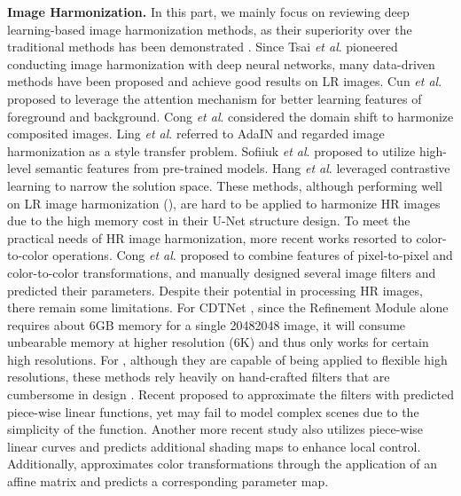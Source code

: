 \documentclass[10pt,journal,twocolumn,twoside]{IEEEtran}
\newcommand{\etal}{\textit{et al}. }
\begin{document}
\textbf{Image Harmonization.} In this part, we mainly focus on reviewing deep learning-based image harmonization methods, as their superiority over the traditional methods\cite{lalonde2007using, xue2012understanding, reinhard2001color, pitie2005n, sunkavalli2010multi} has been demonstrated \cite{tsai2017deep}.  Since Tsai \etal \cite{tsai2017deep} pioneered conducting image harmonization with deep neural networks,  many data-driven methods\cite{cun2020improving, cong2020dovenet, guo2021image, ling2021region, sofiiuk2021foreground, hang2022scs} have been proposed and achieve good results on LR images. Cun \etal \cite{cun2020improving} proposed to leverage the attention mechanism for better learning features of foreground and background. Cong \etal \cite{cong2020dovenet} considered the domain shift to harmonize composited images. Ling \etal \cite{ling2021region} referred to AdaIN\cite{huang2017arbitrary} and regarded image harmonization as a style transfer problem. Sofiiuk \etal \cite{sofiiuk2021foreground} proposed to utilize high-level semantic features from pre-trained models. Hang \etal \cite{hang2022scs} leveraged contrastive learning to narrow the solution space.  These methods, although performing well on LR image harmonization (), are hard to be applied to harmonize HR images due to the high memory cost in their U-Net\cite{ronneberger2015u} structure design.  To meet the practical needs of HR image harmonization, more recent works \cite{cong2022high, ke2022harmonizer, xue2022dccf, liang2022spatial, wang2023semi, guerreiro2023pct} resorted to color-to-color operations. Cong \etal \cite{cong2022high} proposed to combine features of pixel-to-pixel and color-to-color transformations, and \cite{ke2022harmonizer, xue2022dccf} manually designed several image filters and predicted their parameters. Despite their potential in processing HR images, there remain some limitations. For CDTNet \cite{cong2022high}, since the Refinement Module alone requires about 6GB memory for a single 20482048 image, it will consume unbearable memory at higher resolution (\eg 6K) and thus only works for certain high resolutions. For \cite{ke2022harmonizer, xue2022dccf}, although they are capable of being applied to flexible high resolutions, these methods rely heavily on hand-crafted filters that are cumbersome in design \cite{ke2022harmonizer, xue2022dccf}. Recent \cite{liang2022spatial} proposed to approximate the filters with predicted piece-wise linear functions, yet may fail to model complex scenes due to the simplicity of the function. Another more recent study \cite{wang2023semi} also utilizes piece-wise linear curves and predicts additional shading maps to enhance local control. Additionally, \cite{guerreiro2023pct} approximates color transformations through the application of an affine matrix and predicts a corresponding parameter map.
\end{document}

